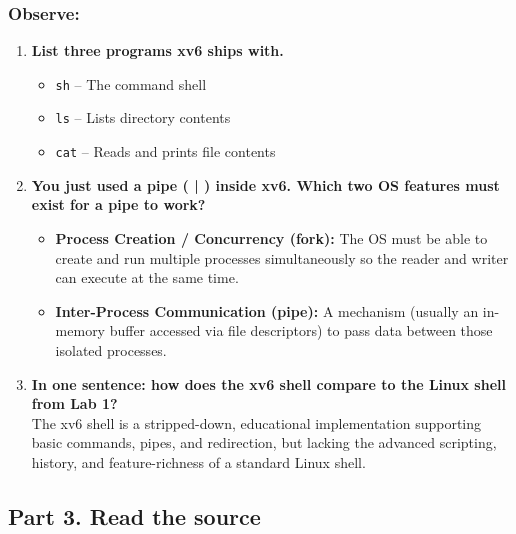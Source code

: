 \documentclass{labreport}
\begin{document}
\subsubsection*{Observe:}
\begin{enumerate}[leftmargin=*]
    \item \textbf{List three programs xv6 ships with.}
    \begin{itemize}[noitemsep, topsep=2pt]
        \item \texttt{sh} -- The command shell
        \item \texttt{ls} -- Lists directory contents
        \item \texttt{cat} -- Reads and prints file contents
    \end{itemize}

    \item \textbf{You just used a pipe ( | ) inside xv6. Which two OS features must exist for a pipe to work?}
    \begin{itemize}[noitemsep, topsep=2pt]
        \item \textbf{Process Creation / Concurrency (fork):} The OS must be able to create and run multiple processes simultaneously so the reader and writer can execute at the same time.
        \item \textbf{Inter-Process Communication (pipe):} A mechanism (usually an in-memory buffer accessed via file descriptors) to pass data between those isolated processes.
    \end{itemize}

    \item \textbf{In one sentence: how does the xv6 shell compare to the Linux shell from Lab 1?}\\[0.2em]
    The xv6 shell is a stripped-down, educational implementation supporting basic commands, pipes, and redirection, but lacking the advanced scripting, history, and feature-richness of a standard Linux shell.
\end{enumerate}

\subsection{Part 3. Read the source}
\end{document}
